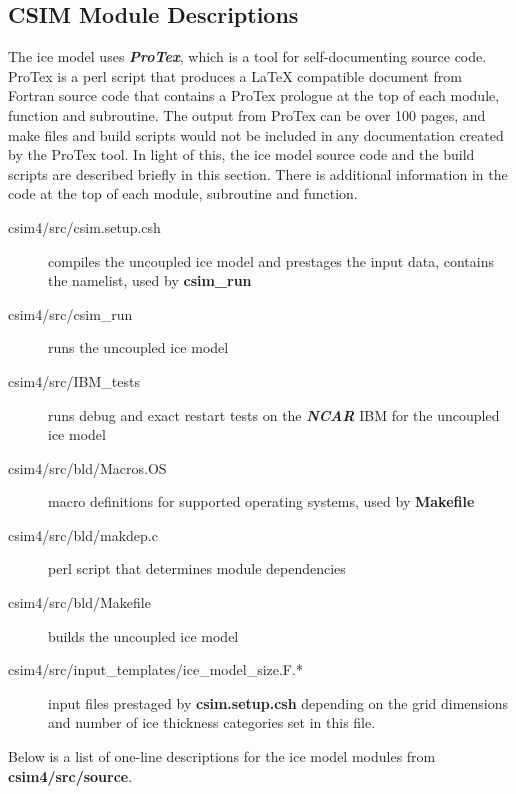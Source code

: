 
\subsection {CSIM Module Descriptions}
\label{sec:csim_dir_structure}

The ice model uses {\bf \textsl{ProTex}}, which is a tool for self-documenting source code.
ProTex is a perl script that produces a LaTeX compatible document from 
Fortran source code that contains a ProTex prologue at the top of each module,
function and subroutine. The output from ProTex can be over 100 pages, and
make files and build scripts would not be included in any documentation
created by the ProTex tool.  In light of this, the ice model source code and
the build scripts are described briefly in this section.  There is additional
information in the code at the top of each module, subroutine and function. 

\begin{description}
  \item [csim4/src/csim.setup.csh] compiles the uncoupled ice model and prestages
                             the input data, contains the namelist, used
                             by {\bf csim\_run}
  \item [csim4/src/csim\_run] runs the uncoupled ice model
  \item [csim4/src/IBM\_tests] runs debug and exact restart tests on the {\bf \textsl{NCAR}}
                  IBM for the uncoupled ice model
  \item [csim4/src/bld/Macros.OS] macro definitions for supported operating systems, 
                            used by {\bf Makefile}
  \item [csim4/src/bld/makdep.c] perl script that determines module dependencies
  \item [csim4/src/bld/Makefile] builds the uncoupled ice model
  \item [csim4/src/input\_templates/ice\_model\_size.F.*] input files prestaged by 
                               {\bf csim.setup.csh} depending on the grid dimensions
                               and number of ice thickness categories set in this file.
\end{description}

Below is a list of one-line descriptions for the ice model modules from {\bf csim4/src/source}.

